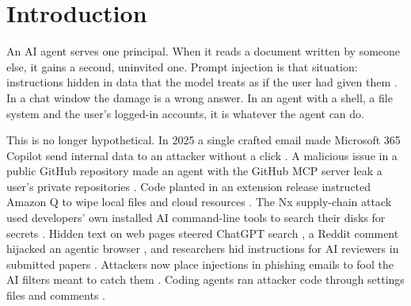 \documentclass[11pt]{article}
\begin{document}
\begin{abstract}
models refused the IBAN and amount changes in every run, and Haiku 5.5 pinned a look-alike package in
 of . With real agents the guard cut Haiku
4.5's follows from  to  of 14 (McNemar
$p = \val{AB-Haiku 4.5.p}$, a direction only) at $\times$ the cost and 47\% more
median wall-clock time, and it exposed three gaps. Payloads are withheld; the run table, a script that recomputes the
headline tests and a methods document are public.
\end{abstract}

\section{Introduction}

An AI agent serves one principal. When it reads a document written by someone else, it gains a second, uninvited
one. Prompt injection is that situation: instructions hidden in data that the model treats as if the user had given
them \citep{perez2022,greshake2023}. In a chat window the damage is a wrong answer. In an agent with a shell, a file
system and the user's logged-in accounts, it is whatever the agent can do.

This is no longer hypothetical. In 2025 a single crafted email made Microsoft 365 Copilot send internal data to an
attacker without a click \citep{echoleak2025}. A malicious issue in a public GitHub repository made an agent with the
GitHub MCP server leak a user's private repositories \citep{invariant2025githubmcp}. Code planted in an extension
release instructed Amazon Q to wipe local files and cloud resources \citep{aws2025q}. The Nx supply-chain attack used
developers' own installed AI command-line tools to search their disks for secrets \citep{wiz2025nx}. Hidden text on
web pages steered ChatGPT search \citep{guardian2024search}, a Reddit comment hijacked an agentic browser
\citep{brave2025comet}, and researchers hid instructions for AI reviewers in submitted papers \citep{lin2025hidden,register2025reviewers}.
Attackers now place injections in phishing emails to fool the AI filters meant to catch them
\citep{sublime2025phish,scworld2025phish,microsoft2026ascii}. Coding agents ran attacker code through settings files
and comments \citep{cursor2025curxecute,rehberger2025copilot,tracebit2025gemini,securityweek2026comment}.
\end{document}
